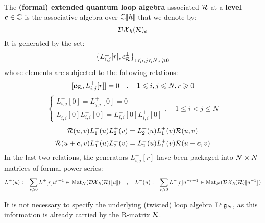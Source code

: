         \begin{definition} \label{def: extended_loop_QUEs_R_matrix_presentation}
            The \textbf{(formal) extended quantum loop algebra} associated $\mathcal{R}$ at a \textbf{level} $\boldsymbol{c} \in \mathbb{C}$ is the associative algebra over $\mathbb{C}[\![\hbar]\!]$ that we denote by:
                $$\mathcal{DX}_{\hbar}(\mathcal{R})_{\boldsymbol{c}}$$
            It is generated by the set:
                $$\left\{ L^{\pm}_{i, j}[r], c_{\mathcal{R}}^{\pm} \right\}_{ 1 \leqslant i, j \leqslant N, r \geqslant 0 }$$
            whose elements are subjected to the following relations:
                $$[ \boldsymbol{c}_{\mathcal{R}}, L^{\pm}_{i, j}[r] ] = 0 \quad, \quad 1 \leqslant i, j \leqslant N, r \geqslant 0$$
                \begin{equation}
                    \begin{cases}
                        L_{i, j}^-[0] = L_{j, i}^+[0] = 0
                        \\
                        L_{i, i}^+[0] L_{i, i}^-[0] = L_{i, i}^-[0] L_{i, i}^+[0]
                    \end{cases}
                    , \quad 1 \leq i < j \leq N
                \end{equation}
                \begin{equation} \label{equation: extended_loop_QUE_RLL_relation}
                    \mathcal{R}(u, v) L_1^{\pm}(u) L_2^{\pm}(v) = L_2^{\pm}(u) L_1^{\pm}(v) \mathcal{R}(u, v)
                \end{equation}
                \begin{equation} \label{equation: extended_loop_QUEs_mixed_relation}
                    \mathcal{R}(u + \boldsymbol{c}, v) L_1^+(u) L_2^-(v) = L_2^-(u) L_1^+(v) \mathcal{R}(u - \boldsymbol{c}, v)
                \end{equation}
            In the last two relations, the generators $L^{\pm}_{i, j}[r]$ have been packaged into $N \x N$ matrices of formal power series:
                \begin{equation} \label{equation: RLL_creation_annihilation_operators}
                    L^+(u) := \sum_{r \geqslant 0} L^+[r] u^{r + 1} \in \operatorname{Mat}_N( \mathcal{DX}_{\hbar}(\mathcal{R})[\![u]\!] ) \quad, \quad L^-(u) := \sum_{r \geqslant 0} L^-[r] u^{-r - 1} \in \operatorname{Mat}_N( \mathcal{DX}_{\hbar}(\mathcal{R})[\![u^{-1}]\!] )
                \end{equation}
        \end{definition}
        \begin{remark}
            It is not necessary to specify the underlying (twisted) loop algebra $\mathrm{L}^{\sigma} \mathfrak{g}_N$, as this information is already carried by the R-matrix $\mathcal{R}$.
        \end{remark}


